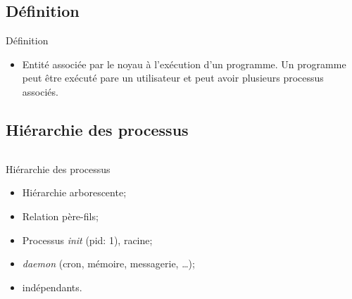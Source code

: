 \begin{frame}{\sectitle}

\def\subsectitle{Définition}
\subsection{\subsectitle}


\begin{alertblock}{\subsectitle}
\begin{itemize}
    \item Entité associée par le noyau à l'exécution d'un programme. Un
    programme peut être exécuté pare un utilisateur et peut avoir plusieurs
    processus associés.
\end{itemize}
\end{alertblock}



\def\subsectitle{Hiérarchie des processus}
\subsection{\subsectitle}

\begin{columns}[b]

\begin{block}{\subsectitle}
\begin{itemize}
    \item Hiérarchie arborescente;
    \item Relation père-fils;
    \item Processus \textit{init} (pid: 1), racine;
    \item \textit{daemon} (cron, mémoire, messagerie, \dots);
    \item indépendants.
\end{itemize}
\end{block}


\end{columns}
\end{frame}
